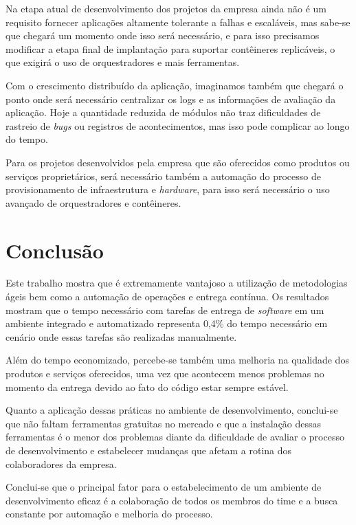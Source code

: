 \documentclass[
12pt,				%
openright,			%
oneside,			%
a4paper,			%
english,			%
french,				%
spanish,			%
brazil,				%
]{abntex2}
\begin{document}
Na etapa atual de desenvolvimento dos projetos da empresa ainda não é um requisito fornecer aplicações altamente tolerante a falhas e escaláveis, mas sabe-se que chegará um momento onde isso será necessário, e para isso precisamos modificar a etapa final de implantação para suportar contêineres replicáveis, o que exigirá o uso de orquestradores e mais ferramentas.

Com o crescimento distribuído da aplicação, imaginamos também que chegará o ponto onde será necessário centralizar os logs e as informações de avaliação da aplicação. Hoje a quantidade reduzida de módulos não traz dificuldades de rastreio de \textit{bugs} ou registros de acontecimentos, mas isso pode complicar ao longo do tempo.

Para os projetos desenvolvidos pela empresa que são oferecidos como produtos ou serviços proprietários, será necessário também a automação do processo de provisionamento de infraestrutura e \textit{hardware}, para isso será necessário o uso avançado de orquestradores e contêineres.


\chapter{Conclusão}

Este trabalho mostra que é extremamente vantajoso a utilização de metodologias ágeis bem como a automação de operações e entrega contínua. Os resultados mostram que o tempo necessário com tarefas de entrega de \textit{software} em um ambiente integrado e automatizado representa 0,4\% do tempo necessário em cenário onde essas tarefas são realizadas manualmente.

Além do tempo economizado, percebe-se também uma melhoria na qualidade dos produtos e serviços oferecidos, uma vez que acontecem menos problemas no momento da entrega devido ao fato do código estar sempre estável.

Quanto a aplicação dessas práticas no ambiente de desenvolvimento, conclui-se que não faltam ferramentas gratuitas no mercado e que a instalação dessas ferramentas é o menor dos problemas diante da dificuldade de avaliar o processo de desenvolvimento e estabelecer mudanças que afetam a rotina dos colaboradores da empresa.

Conclui-se que o principal fator para o estabelecimento de um ambiente de desenvolvimento eficaz é a colaboração de todos os membros do time e a busca constante por automação e melhoria do processo.
\end{document}
